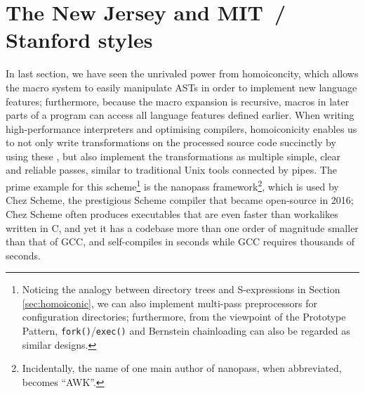 \section{The New Jersey and MIT~/ Stanford styles}\label{sec:wib}

In last section, we have seen the unrivaled power from homoiconcity, which
allows the macro system to easily manipulate ASTs in order to implement new
language features; furthermore, because the macro expansion is recursive,
macros in later parts of a program can access all language features defined
earlier.  When writing high-performance interpreters and optimising compilers,
homoiconicity enables us to not only write transformations on the processed
source code succinctly by using these , but also
implement the transformations as multiple simple, clear and reliable passes,
similar to traditional Unix tools connected by pipes.  The prime example for
this  scheme\footnote{\label{fn:slew}Noticing
the analogy between directory trees and S-expressions in Section~%
\ref{sec:homoiconic}, we can also implement multi-pass preprocessors for
configuration directories; furthermore, from the
viewpoint of the Prototype Pattern, \texttt{fork()}/\texttt{exec()} and
Bernstein chainloading can also be regarded as similar designs.} is the
nanopass framework\footnote{Incidentally, the
name of one main author of nanopass, when abbreviated, becomes ``AWK''.},
which is used by Chez Scheme, the prestigious Scheme
compiler that became open-source in 2016; Chez Scheme often produces
executables that are even faster than workalikes written in C, and yet it
has a codebase more than one order of magnitude smaller than that of GCC,
and self-compiles in seconds while GCC requires thousands of seconds.

